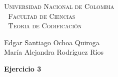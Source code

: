 \documentclass[12pt, a4paper]{article}%
\begin{document}
\setlength{\parindent}{0cm}
\hoffset-0.46cm
\voffset-1.46cm

\begin{window}
\large\scshape  \hspace{0.4cm}\textsf{Universidad Nacional de Colombia} \\
\textcolor{white}{\tiny.}  \large \hspace{1.5cm} \textsf{Facultad de Ciencias} \\
\textcolor{white}{\tiny.}   \normalsize\hspace{0.7cm}\textsf{Teoria de Codificación}\\
 

\end{window}

\vspace{0.2cm}
\small
\textsf{Edgar Santiago Ochoa Quiroga\\
María Alejandra  Rodríguez  Ríos} 
\normalsize
\dotfill
\vspace{0.7cm}

 \textbf{Ejercicio 3}
 
 
 





 
\end{document}
